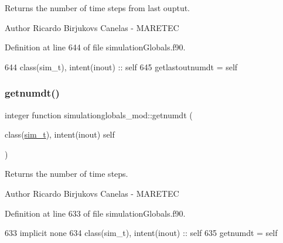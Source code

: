 Returns the number of time steps from last ouptut. 

\begin{DoxyAuthor}{Author}
Ricardo Birjukovs Canelas -\/ M\+A\+R\+E\+T\+EC 
\end{DoxyAuthor}


Definition at line 644 of file simulation\+Globals.\+f90.


\begin{DoxyCode}
644     \textcolor{keywordtype}{class}(sim\_t), \textcolor{keywordtype}{intent(inout)} :: self
645     getlastoutnumdt = self%
\end{DoxyCode}
\mbox{\label{namespacesimulationglobals__mod_af313959d6cbfc4cb0ab330aa094511c5}} 
\subsubsection{\texorpdfstring{getnumdt()}{getnumdt()}}
{\footnotesize\ttfamily integer function simulationglobals\+\_\+mod\+::getnumdt (\begin{DoxyParamCaption}\item[{class(\mbox{\hyperlink{structsimulationglobals__mod_1_1sim__t}{sim\+\_\+t}}), intent(inout)}]{self }\end{DoxyParamCaption})\hspace{0.3cm}{\ttfamily [private]}}



Returns the number of time steps. 

\begin{DoxyAuthor}{Author}
Ricardo Birjukovs Canelas -\/ M\+A\+R\+E\+T\+EC 
\end{DoxyAuthor}


Definition at line 633 of file simulation\+Globals.\+f90.


\begin{DoxyCode}
633     \textcolor{keywordtype}{implicit none}
634     \textcolor{keywordtype}{class}(sim\_t), \textcolor{keywordtype}{intent(inout)} :: self
635     getnumdt = self%
\end{DoxyCode}
\mbox{\label{namespacesimulationglobals__mod_a2b76dc3e6cbf1256253c54903df8393b}} 

